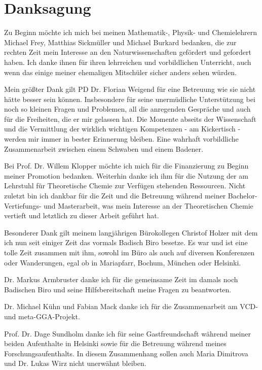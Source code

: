 \section*{Danksagung}
\thispagestyle{empty}
Zu Beginn möchte ich mich bei meinen Mathematik-, Physik- und Chemielehrern Michael Frey, Matthias Sickmüller und Michael Burkard bedanken, die zur rechten Zeit mein Interesse an den Naturwissenschaften gefördert und gefordert haben. Ich danke ihnen für ihren lehrreichen und vorbildlichen Unterricht, auch wenn das einige meiner ehemaligen Mitschüler sicher anders sehen würden.

\bigskip
Mein größter Dank gilt PD Dr. Florian Weigend für eine Betreuung wie sie nicht hätte besser sein können. Insbesondere für seine unermüdliche Unterstützung bei noch so kleinen Fragen und Problemen, all die anregenden Gespräche und auch für die Freiheiten, die er mir gelassen hat. Die Momente abseits der Wissenschaft und die Vermittlung der wirklich wichtigen Kompetenzen - am Kickertisch - werden mir immer in bester Erinnerung bleiben. Eine wahrhaft vorbildliche Zusammenarbeit zwischen einem Schwaben und einem Badener.

\bigskip
Bei Prof. Dr. Willem Klopper möchte ich mich für die Finanzierung zu Beginn meiner Promotion bedanken. Weiterhin danke ich ihm für die Nutzung der am Lehrstuhl für Theoretische Chemie zur Verfügen stehenden Ressourcen. Nicht zuletzt bin ich dankbar für die Zeit und die Betreuung während meiner Bachelor- Vertiefungs- und Masterarbeit, was mein Interesse an der Theoretischen Chemie vertieft und letztlich zu dieser Arbeit geführt hat.

\bigskip
Besonderer Dank gilt meinem langjährigen Bürokollegen Christof Holzer mit dem ich nun seit einiger Zeit das \glqq vormals Badisch Biro\grqq{} besetze. Es war und ist eine tolle Zeit zusammen mit ihm, sowohl im Büro als auch auf diversen Konferenzen oder Wanderungen, egal ob in Mariapfarr, Bochum, München oder Helsinki.

\bigskip
Dr. Markus Armbruster danke ich für die gemeinsame Zeit im damals noch \glqq Badischen Biro\grqq{} und seine Hilfsbereitschaft meine Fragen zu beantworten. 

Dr. Michael Kühn und Fabian Mack danke ich für die Zusammenarbeit am VCD- und meta-GGA-Projekt.  

\bigskip
Prof. Dr. Dage Sundholm danke ich für seine Gastfreundschaft während meiner beiden Aufenthalte in Helsinki sowie für die Betreuung während meines Forschungsaufenthalts. In diesem Zusammenhang sollen auch Maria Dimitrova und Dr. Lukas Wirz nicht unerwähnt bleiben.
\newpage
\thispagestyle{empty}


